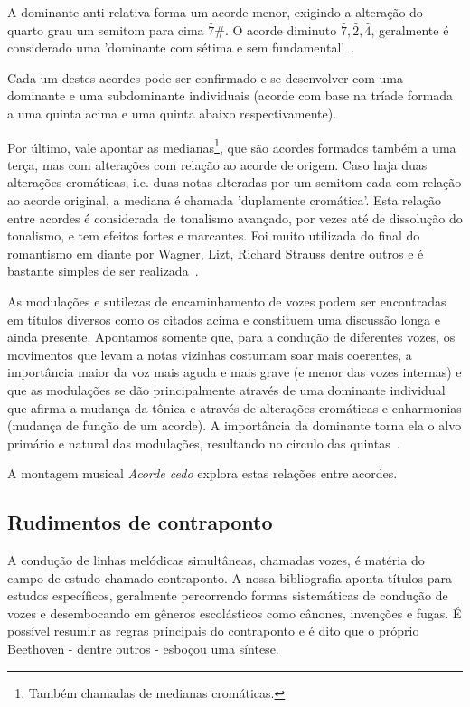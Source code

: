 A dominante anti-relativa forma um acorde menor, exigindo a alteração do quarto grau um semitom para cima $\hat{7}\#$. O acorde diminuto $\hat{7},\hat{2},\hat{4}$, geralmente é considerado uma 'dominante com sétima e sem fundamental'~\cite{Koellheuteur}.

Cada um destes acordes pode ser confirmado e se desenvolver com uma dominante e uma subdominante individuais (acorde com base na tríade formada a uma quinta acima e uma quinta abaixo respectivamente).

Por último, vale apontar as medianas\footnote{Também chamadas de medianas cromáticas.}, que são acordes formados também a uma terça, mas com alterações com relação ao acorde de origem. Caso haja duas alterações cromáticas, i.e. duas notas alteradas por um semitom cada com relação ao acorde original, a mediana é chamada 'duplamente cromática'. Esta relação entre acordes é considerada de tonalismo avançado, por vezes até de dissolução do tonalismo, e tem efeitos fortes e marcantes. Foi muito utilizada do final do romantismo em diante por Wagner, Lizt, Richard Strauss dentre outros e é bastante simples de ser realizada~\cite{Harmonia,Schachter}.

As modulações e sutilezas de encaminhamento de vozes podem ser encontradas em títulos diversos como os citados acima e constituem uma discussão longa e ainda presente. Apontamos somente que, para a condução de diferentes vozes, os movimentos que levam a notas vizinhas costumam soar mais coerentes, a importância maior da voz mais aguda e mais grave (e menor das vozes internas) e que as modulações se dão principalmente através de uma dominante individual que afirma a mudança da tônica e através de alterações cromáticas e enharmonias (mudança de função de um acorde). A importância da dominante torna ela o alvo primário e natural das modulações, resultando no circulo das quintas~\cite{Harmonia,Schachter,Koellheuteur,Harmony}.

A montagem musical \emph{Acorde cedo} explora estas relações entre acordes.

\subsection{Rudimentos de contraponto}

A condução de linhas melódicas simultâneas, chamadas vozes,
é matéria do campo de estudo chamado contraponto. A nossa bibliografia aponta títulos para estudos específicos, geralmente percorrendo formas sistemáticas de condução de vozes e desembocando em gêneros escolásticos como cânones, invenções e fugas. É possível resumir
as regras principais do contraponto e é dito que o próprio Beethoven - dentre outros - esboçou uma síntese.

